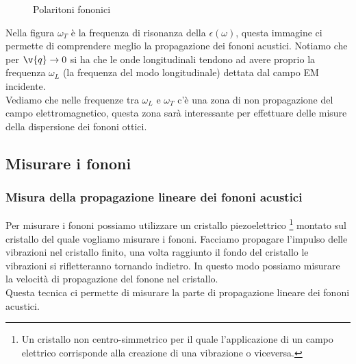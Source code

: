 \begin{figure}[ht]
    \centering
    \caption{Polaritoni fononici}
    \label{fig:polaritoni-fononici}
\end{figure}
\noindent
Nella figura $\omega_T$ è la frequenza di risonanza della $\epsilon(\omega)$, questa immagine ci permette di comprendere meglio la propagazione dei fononi acustici. Notiamo che per $\v{q}\to 0$ si ha che le onde longitudinali tendono ad avere proprio la frequenza $\omega_L$ (la frequenza del modo longitudinale) dettata dal campo EM incidente.\\
Vediamo che nelle frequenze tra $\omega_L$ e $\omega_T$ c'è una zona di non propagazione del campo elettromagnetico, questa zona sarà interessante per effettuare delle misure della dispersione dei fononi ottici.
\subsection{Misurare i fononi}
\label{subsec:Misurare i fononi}
\subsubsection{Misura della propagazione lineare dei fononi acustici}
\label{subsubsec:Misura della propagazione lineare dei fononi acustici}
Per misurare i fononi possiamo utilizzare un cristallo piezoelettrico \footnote{Un cristallo non centro-simmetrico per il quale l'applicazione di un campo elettrico corrisponde alla creazione di una vibrazione o viceversa.} montato sul cristallo del quale vogliamo misurare i fononi. Facciamo propagare l'impulso delle vibrazioni nel cristallo finito, una volta raggiunto il fondo del cristallo le vibrazioni si rifletteranno tornando indietro. In questo modo possiamo misurare la velocità di propagazione del fonone nel  cristallo. \\
Questa tecnica ci permette di misurare la parte di propagazione lineare dei fononi acustici. 

